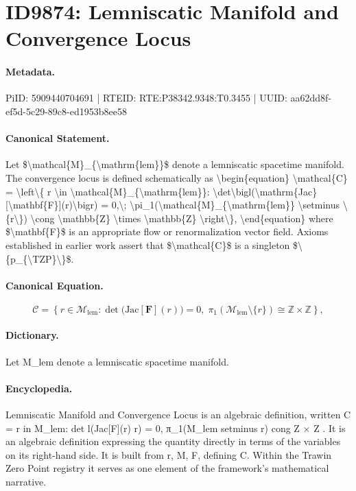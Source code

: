 \section*{ID9874: Lemniscatic Manifold and Convergence Locus}
\paragraph{Metadata.}
PiID: 5909440704691 | RTEID: RTE:P38342.9348:T0.3455 | UUID: aa62dd8f-ef5d-5c29-89c8-ed1953b8ee58

\paragraph{Canonical Statement.}
Let \$\textbackslash{}mathcal\{M\}\_\{\textbackslash{}mathrm\{lem\}\}\$ denote a lemniscatic spacetime manifold. The convergence locus is defined schematically as \textbackslash{}begin\{equation\} \textbackslash{}mathcal\{C\} = \textbackslash{}left\textbackslash{}\{ r \textbackslash{}in \textbackslash{}mathcal\{M\}\_\{\textbackslash{}mathrm\{lem\}\}: \textbackslash{}det\textbackslash{}bigl(\textbackslash{}mathrm\{Jac\}[\textbackslash{}mathbf\{F\}](r)\textbackslash{}bigr) = 0,\textbackslash{}; \textbackslash{}pi\_1(\textbackslash{}mathcal\{M\}\_\{\textbackslash{}mathrm\{lem\}\} \textbackslash{}setminus \textbackslash{}\{r\textbackslash{}\}) \textbackslash{}cong \textbackslash{}mathbb\{Z\} \textbackslash{}times \textbackslash{}mathbb\{Z\} \textbackslash{}right\textbackslash{}\}, \textbackslash{}end\{equation\} where \$\textbackslash{}mathbf\{F\}\$ is an appropriate flow or renormalization vector field. Axioms established in earlier work assert that \$\textbackslash{}mathcal\{C\}\$ is a singleton \$\textbackslash{}\{p\_\{\textbackslash{}TZP\}\textbackslash{}\}\$.

\paragraph{Canonical Equation.}
\[
\mathcal{C} = \left\{ r \in \mathcal{M}_{\mathrm{lem}}: \det\bigl(\mathrm{Jac}[\mathbf{F}](r)\bigr) = 0,\; \pi_1(\mathcal{M}_{\mathrm{lem}} \setminus \{r\}) \cong \mathbb{Z} \times \mathbb{Z} \right\},
\]

\paragraph{Dictionary.}
Let M\_lem denote a lemniscatic spacetime manifold.

\paragraph{Encyclopedia.}
Lemniscatic Manifold and Convergence Locus is an algebraic definition, written C = r in M\_lem: det l(Jac[F](r) r) = 0, π\_1(M\_lem setminus r) cong Z × Z . It is an algebraic definition expressing the quantity directly in terms of the variables on its right-hand side. It is built from r, M, F, defining C. Within the Trawin Zero Point registry it serves as one element of the framework's mathematical narrative.
